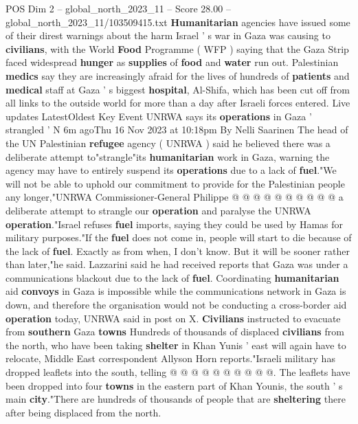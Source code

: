 \begin{textsample}{POS Dim 2 – global\_north\_2023\_11 – Score 28.00 – global\_north\_2023\_11/103509415.txt}  \label{ex:f2_pos_235}
\textbf{Humanitarian} agencies have issued some of their direst warnings about the harm Israel ' s war in Gaza was causing to \textbf{civilians}, with the World \textbf{Food} Programme ( WFP ) saying that the Gaza Strip faced widespread \textbf{hunger} as \textbf{supplies} of \textbf{food} and \textbf{water} run out.
Palestinian \textbf{medics} say they are increasingly afraid for the lives of hundreds of \textbf{patients} and \textbf{medical} staff at Gaza ' s biggest \textbf{hospital}, Al-Shifa, which has been cut off from all links to the outside world for more than a day after Israeli forces entered.
Live updates LatestOldest Key Event UNRWA says its \textbf{operations} in Gaza ' strangled ' N 6m agoThu 16 Nov 2023 at 10:18pm By Nelli Saarinen The head of the UN Palestinian \textbf{refugee} agency ( UNRWA ) said he believed there was a deliberate attempt to"strangle"its \textbf{humanitarian} work in Gaza, warning the agency may have to entirely suspend its \textbf{operations} due to a lack of \textbf{fuel}."We will not be able to uphold our commitment to provide for the Palestinian people any longer,"UNRWA Commissioner-General Philippe @ @ @ @ @ @ @ @ @ @ a deliberate attempt to strangle our \textbf{operation} and paralyse the UNRWA \textbf{operation}."Israel refuses \textbf{fuel} imports, saying they could be used by Hamas for military purposes."If the \textbf{fuel} does not come in, people will start to die because of the lack of \textbf{fuel}.
Exactly as from when, I don't know.
But it will be sooner rather than later,"he said.
Lazzarini said he had received reports that Gaza was under a communications blackout due to the lack of \textbf{fuel}.
Coordinating \textbf{humanitarian} aid \textbf{convoys} in Gaza is impossible while the communications network in Gaza is down, and therefore the organisation would not be conducting a cross-border aid \textbf{operation} today, UNRWA said in post on X. \textbf{Civilians} instructed to evacuate from \textbf{southern} Gaza \textbf{towns} Hundreds of thousands of displaced \textbf{civilians} from the north, who have been taking \textbf{shelter} in Khan Yunis ' east will again have to relocate, Middle East correspondent Allyson Horn reports."Israeli military has dropped leaflets into the south, telling @ @ @ @ @ @ @ @ @ @.
The leaflets have been dropped into four \textbf{towns} in the eastern part of Khan Younis, the south ' s main \textbf{city}."There are hundreds of thousands of people that are \textbf{sheltering} there after being displaced from the north.

\end{textsample}
